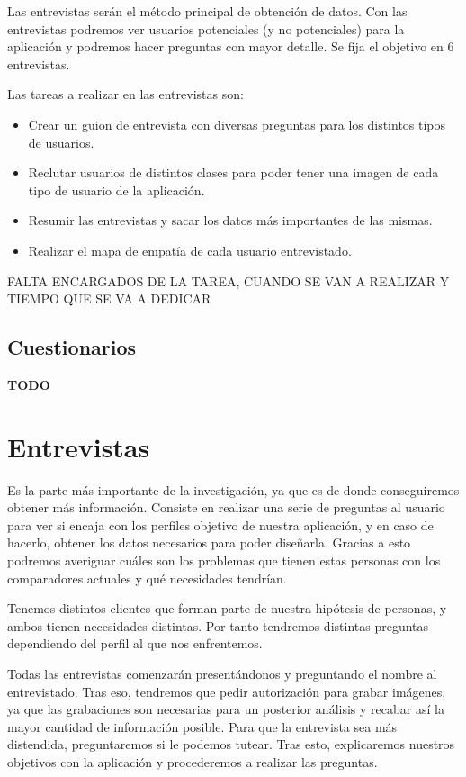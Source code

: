 Las entrevistas serán el método principal de obtención de datos. Con las entrevistas podremos ver usuarios potenciales (y no potenciales) para la aplicación y podremos hacer preguntas con mayor detalle. Se fija el objetivo en 6 entrevistas.

Las tareas a realizar en las entrevistas son:
\begin{itemize}
    \item Crear un guion de entrevista con diversas preguntas para los distintos tipos de usuarios.
    \item Reclutar usuarios de distintos clases para poder tener una imagen de cada tipo de usuario de la aplicación.
    \item Resumir las entrevistas y sacar los datos más importantes de las mismas.
    \item Realizar el mapa de empatía de cada usuario entrevistado.
\end{itemize}

FALTA ENCARGADOS DE LA TAREA, CUANDO SE VAN A REALIZAR Y TIEMPO QUE SE VA A DEDICAR

\subsection{Cuestionarios} \label{subsec:cuestionarios}

\textbf{TODO}

\section{Entrevistas}

Es la parte más importante de la investigación, ya que es de donde conseguiremos obtener más información. Consiste en realizar una serie de preguntas al usuario para
ver si encaja con los perfiles objetivo de nuestra aplicación, y en caso de hacerlo, obtener los datos necesarios para poder diseñarla. Gracias a esto podremos averiguar
cuáles son los problemas que tienen estas personas con los comparadores actuales y qué necesidades tendrían.

Tenemos distintos clientes que forman parte de nuestra hipótesis de personas, y ambos tienen necesidades distintas. Por tanto tendremos distintas preguntas
dependiendo del perfil al que nos enfrentemos.

Todas las entrevistas comenzarán presentándonos y preguntando el nombre al entrevistado. Tras eso, tendremos que pedir autorización para grabar imágenes, ya que las
grabaciones son necesarias para un posterior análisis y recabar así la mayor cantidad de información posible. Para que la entrevista sea más distendida, preguntaremos
si le podemos tutear. Tras esto, explicaremos nuestros objetivos con la aplicación y procederemos a realizar las preguntas.

